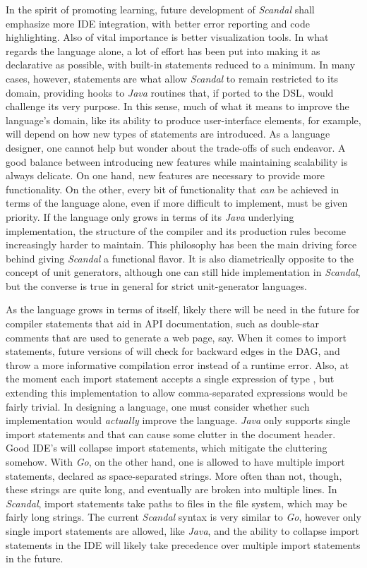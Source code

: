 In the spirit of promoting learning, future development of \emph{Scandal} shall emphasize more IDE integration, with better error reporting and code highlighting. Also of vital importance is better visualization tools. In what regards the language alone, a lot of effort has been put into making it as declarative as possible, with built-in statements reduced to a minimum. In many cases, however, statements are what allow \emph{Scandal} to remain restricted to its domain, providing hooks to \emph{Java} routines that, if ported to the DSL, would challenge its very purpose. In this sense, much of what it means to improve the language's domain, like its ability to produce user-interface elements, for example, will depend on how new types of statements are introduced. As a language designer, one cannot help but wonder about the trade-offs of such endeavor. A good balance between introducing new features while maintaining scalability is always delicate. On one hand, new features are necessary to provide more functionality. On the other, every bit of functionality that \emph{can} be achieved in terms of the language alone, even if more difficult to implement, must be given priority. If the language only grows in terms of its \emph{Java} underlying implementation, the structure of the compiler and its production rules become increasingly harder to maintain. This philosophy has been the main driving force behind giving \emph{Scandal} a functional flavor. It is also diametrically opposite to the concept of unit generators, although one can still hide implementation in \emph{Scandal}, but the converse is true in general for strict unit-generator languages.

As the language grows in terms of itself, likely there will be need in the future for compiler statements that aid in API documentation, such as double-star comments that are used to generate a web page, say. When it comes to import statements, future versions of  will check for backward edges in the DAG, and throw a more informative compilation error instead of a runtime error. Also, at the moment each import statement accepts a single expression of type , but extending this implementation to allow comma-separated expressions would be fairly trivial. In designing a language, one must consider whether such implementation would \emph{actually} improve the language. \emph{Java} only supports single import statements and that can cause some clutter in the document header. Good IDE's will collapse import statements, which mitigate the cluttering somehow. With \emph{Go}, on the other hand, one is allowed to have multiple import statements, declared as space-separated strings. More often than not, though, these strings are quite long, and eventually are broken into multiple lines. In \emph{Scandal}, import statements take paths to files in the file system, which may be fairly long strings. The current \emph{Scandal} syntax is very similar to \emph{Go}, however only single import statements are allowed, like \emph{Java}, and the ability to collapse import statements in the IDE will likely take precedence over multiple import statements in the future.

